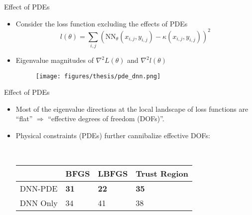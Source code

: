 \documentclass[usenames,dvipsnames]{beamer}
\begin{document}
\begin{frame}{Effect of PDEs}
	\begin{itemize}
\item Consider the loss function excluding the effects of PDEs 
$$    l(\theta) = \sum_{i,j} (\text{NN}_\theta(x_{i,j}, y_{i,j}) - \kappa(x_{i,j}, y_{i,j}))^2 $$

\item Eigenvalue magnitudes of $\nabla^2 L(\theta)$ and $\nabla^2 l(\theta)$
	\begin{figure}[htbp]
	\centering
	\texttt{[image: figures/thesis/pde\_dnn.png]}
\end{figure}
	\end{itemize}
\end{frame}

\begin{frame}{Effect of PDEs}
\begin{itemize}
\item Most of the eigenvalue directions at the local landscape of loss functions are ``flat'' $\Rightarrow$ ``effective degrees of freedom (DOFs)''. 

\item Physical constraints (PDEs) further cannibalize effective DOFs:

\

\begin{center}
		\begin{tabular}{@{}llll@{}}
		\toprule
		& BFGS & LBFGS & Trust Region \\ \midrule
		DNN-PDE     & \textbf{31}   & \textbf{22}    & \textbf{35}           \\
		DNN Only &  34   & 41    & 38           \\ \bottomrule
	\end{tabular}
\end{center}


\end{itemize}
\end{frame}
\end{document}
